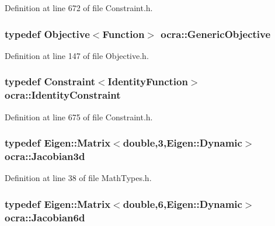 Definition at line 672 of file Constraint.\+h.

\subsubsection[{\texorpdfstring{Generic\+Objective}{GenericObjective}}]{\setlength{\rightskip}{0pt plus 5cm}typedef {\bf Objective}$<${\bf Function}$>$ {\bf ocra\+::\+Generic\+Objective}}\hypertarget{namespaceocra_a37a91885f4fa5c523d22cb15d5673062}{}\label{namespaceocra_a37a91885f4fa5c523d22cb15d5673062}


Definition at line 147 of file Objective.\+h.

\subsubsection[{\texorpdfstring{Identity\+Constraint}{IdentityConstraint}}]{\setlength{\rightskip}{0pt plus 5cm}typedef {\bf Constraint}$<${\bf Identity\+Function}$>$ {\bf ocra\+::\+Identity\+Constraint}}\hypertarget{namespaceocra_a5fc023ff4ef8f4b0cdf410e088090731}{}\label{namespaceocra_a5fc023ff4ef8f4b0cdf410e088090731}


Definition at line 675 of file Constraint.\+h.

\subsubsection[{\texorpdfstring{Jacobian3d}{Jacobian3d}}]{\setlength{\rightskip}{0pt plus 5cm}typedef Eigen\+::\+Matrix$<$double,3,Eigen\+::\+Dynamic$>$ {\bf ocra\+::\+Jacobian3d}}\hypertarget{namespaceocra_a9d83c179b8710177bed2bbba41a12447}{}\label{namespaceocra_a9d83c179b8710177bed2bbba41a12447}


Definition at line 38 of file Math\+Types.\+h.

\subsubsection[{\texorpdfstring{Jacobian6d}{Jacobian6d}}]{\setlength{\rightskip}{0pt plus 5cm}typedef Eigen\+::\+Matrix$<$double,6,Eigen\+::\+Dynamic$>$ {\bf ocra\+::\+Jacobian6d}}\hypertarget{namespaceocra_ac73b015f9f7cb0c252c4d5c4800f559a}{}\label{namespaceocra_ac73b015f9f7cb0c252c4d5c4800f559a}


